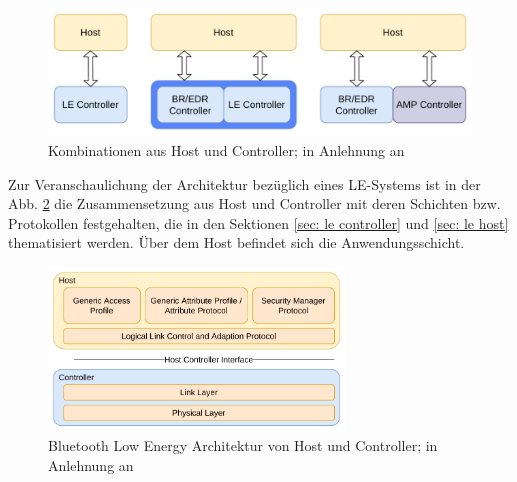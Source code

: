 \begin{figure}
    \centering
    \includegraphics[width=0.9\linewidth]{graphics/kombination_host_controller.pdf}
    \caption[Kombinationen aus Host und Controller]{Kombinationen aus Host und Controller; in Anlehnung an \cite{BtSpec4.0_fig_124}}
    \label{fig: kombinationen aus host und controller}
\end{figure}

Zur Veranschaulichung der Architektur bezüglich eines LE-Systems ist in der Abb. \ref{fig: host controller architektur} die Zusammensetzung aus Host und Controller mit deren Schichten bzw. Protokollen festgehalten, die in den Sektionen \ref{sec: le controller} und \ref{sec: le host} thematisiert werden. Über dem Host befindet sich die Anwendungsschicht.

\begin{figure}
    \centering
    \includegraphics[width=0.7\textwidth]{graphics/host_controller_hci.pdf}
    \caption[Bluetooth Low Energy Architektur von Host und Controller]{Bluetooth Low Energy Architektur von Host und Controller; in Anlehnung an \cite{BtSpec4.0_fig_137}}
    \label{fig: host controller architektur}
\end{figure}